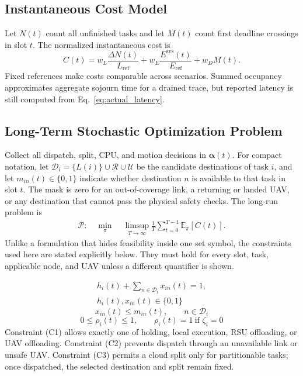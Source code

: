 \subsection{Instantaneous Cost Model}
Let $N(t)$ count all unfinished tasks and let $M(t)$ count first
deadline crossings in slot $t$. The normalized instantaneous cost is
\begin{equation}
C(t)=w_L\frac{\Delta N(t)}{L_{\mathrm{ref}}}
+w_E\frac{E^{\mathrm{sys}}(t)}{E_{\mathrm{ref}}}
+w_DM(t).
\label{eq:cost}
\end{equation}
Fixed references make costs comparable across scenarios. Summed
occupancy approximates aggregate sojourn time for a drained trace, but
reported latency is still computed from Eq.~\eqref{eq:actual_latency}.

\subsection{Long-Term Stochastic Optimization Problem}
Collect all dispatch, split, CPU, and motion decisions in
$\boldsymbol\alpha(t)$. For compact notation, let
$\mathcal D_i=\{L(i)\}\cup\mathcal R\cup\mathcal U$ be the candidate
destinations of task $i$, and let $m_{in}(t)\in\{0,1\}$ indicate whether
destination $n$ is available to that task in slot $t$. The mask is zero for
an out-of-coverage link, a returning or landed UAV, or any destination that
cannot pass the physical safety checks. The long-run problem is
\begin{equation}
\begin{aligned}
\mathcal P:\quad \min_{\pi}\;&
\limsup_{T\to\infty}\frac1T
\sum_{t=0}^{T-1}\mathbb E_{\pi}[C(t)].
\end{aligned}
\label{eq:problem}
\end{equation}
Unlike a formulation that hides feasibility inside one set symbol, the
constraints used here are stated explicitly below. They must hold for every
slot, task, applicable node, and UAV unless a different quantifier is shown.

\begin{equation}
\begin{gathered}
h_i(t)+\sum_{n\in\mathcal D_i}x_{in}(t)=1,\\
h_i(t),x_{in}(t)\in\{0,1\}
\end{gathered}
\tag{C1}\label{con:routing}
\end{equation}
\begin{equation}
x_{in}(t)\le m_{in}(t),\qquad n\in\mathcal D_i
\tag{C2}\label{con:mask}
\end{equation}
\begin{equation}
0\le\rho_i(t)\le1,\qquad
\rho_i(t)=1\ \text{if }\zeta_i=0
\tag{C3}\label{con:split}
\end{equation}
Constraint (C1) allows exactly one of holding, local execution, RSU
offloading, or UAV offloading. Constraint (C2) prevents dispatch through an
unavailable link or unsafe UAV. Constraint (C3) permits a cloud split only
for partitionable tasks; once dispatched, the selected destination and split
remain fixed.

